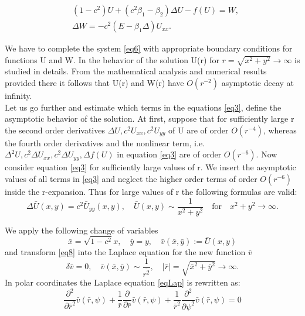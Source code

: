 \documentclass[12pt]{article}
\theoremstyle{theorem}
\theoremstyle{defi}
\begin{document}
\begin{equation}\label{eq6}
\begin{split}
&(1-c^2) U + ( c^2\beta_1 -  \beta_2) \Delta U  - f (U) = W, \\ 
&\Delta W =  -c^2  (E- \beta_1 \Delta) U_{xx}. 
\end{split}
\end{equation}

We have to complete the system \eqref{eq6} with appropriate boundary conditions for functions U and W. In \cite{ref6} the behavior of the solution U(r) for  $ r=\sqrt{x^2 + y^2}\rightarrow \infty$ is studied in details. From the mathematical analysis and numerical results provided there it follows that U(r) and W(r) have  $O(r^{-2})$ asymptotic decay at infinity. 
\\
	Let us go further and estimate which terms in the equations \eqref{eq3},  define the asymptotic behavior of the solution. At first, suppose that for sufficiently large r the second order derivatives $\Delta U , c^2U_{xx} , c^2U_{yy}$  of U are of order  $O(r^{-4})$, whereas the fourth order derivatives and the nonlinear term, i.e.  $\Delta^2 U , c^2\Delta U_{xx} , c^2\Delta U_{yy}, \Delta f(U)$    in equation \eqref{eq3} are of order $O(r^{-6})$.  
Now consider equation \eqref{eq3} for sufficiently large values of r. We insert the asymptotic values of all terms in \eqref{eq3} and neglect the higher order terms of order $O(r^{-6})$ inside the r-expansion. Thus for large values of r the following formulas are valid:
\begin{equation}
 \Delta \bar{U}(x,y) =   c^2   \bar{U}_{yy}(x,y) , \quad  \bar{U}(x,y) \sim \frac{1}{x^2 + y^2} \quad \text{for} \quad x^2 + y^2 \rightarrow \infty  . \label{eq8}
\end{equation}


We apply the following change of variables
\begin{equation}
\bar{x} = \sqrt{1-c^2}x , \quad  \bar{y} = y, \quad \bar{v}( \bar{x}, \bar{y}) := \bar{U} (x, y)\label{eqVC}
\end{equation}
and transform \eqref{eq8} into the Laplace equation for the new function $\bar{v}$
\begin{equation} \label{eqLap}
\delta \bar{v} = 0, \quad \bar{v}( \bar{x}, \bar{y}) \sim \frac{1}{\bar{r^2}}, \quad |\bar{r}|=\sqrt{\bar{x}^2 + \bar{y}^2} \rightarrow \infty.
\end{equation}
In polar coordinates the Laplace equation \eqref{eqLap} is rewritten as:
\begin{equation} \label{eqLapPol}
\frac{\partial^2}{\partial \bar{r}^2} \bar{v}(\bar{r}, \psi) + \frac{1}{\bar{r}} \frac{\partial}{\partial \bar{r}}\bar{v}(\bar{r}, \psi) +  \frac{1}{\bar{r}^2} \frac{\partial^2}{\partial \psi^2} \bar{v}(\bar{r}, \psi) = 0
\end{equation}
\end{document}
